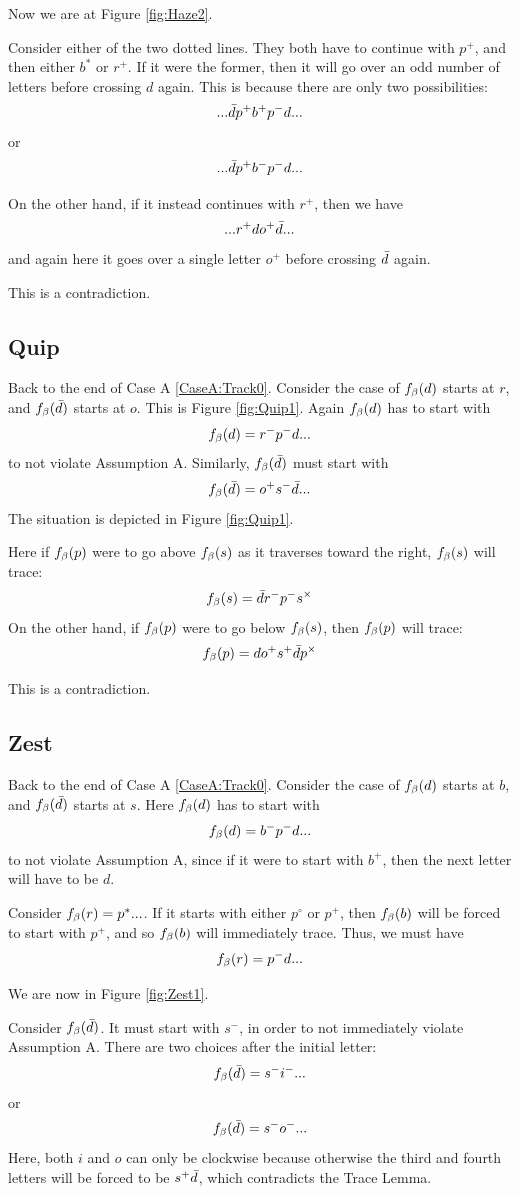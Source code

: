 Now we are at Figure \ref{fig:Haze2}.

Consider either of the two dotted lines. They both have to continue with $p^+$, and then either $b^*$ or $r^+$. If it were the former, then it will go over an odd number of letters before crossing $d$ again. This is because there are only two possibilities:
\[
...\bar{d} p^+ b^+ p^- d...
\]
or 
\[
...\bar{d} p^+ b^- p^- d...
\]

On the other hand, if it instead continues with $r^+$, then we have
\[
...r^+ d o^+ \bar{d}...
\]
and again here it goes over a single letter $o^+$ before crossing $\bar{d}$ again. 

This is a contradiction.

\subsection{Quip}\label{Quip}
Back to the end of Case A \ref{CaseA:Track0}. Consider the case of $f_\beta(d)$ starts at $r$, and $f_\beta(\bar{d})$ starts at $o$. This is Figure \ref{fig:Quip1}. Again $f_\beta(d)$ has to start with
\[
f_\beta(d) = r^- p^- d...
\]
to not violate Assumption A. Similarly, $f_\beta(\bar{d})$ must start with
\[
f_\beta(\bar{d}) = o^+ s^- \bar{d}...
\]
The situation is depicted in Figure \ref{fig:Quip1}.

Here if $f_\beta(p)$ were to go above $f_\beta(s)$ as it traverses toward the right, $f_\beta(s)$ will trace:
\[
f_\beta(s) = \bar{d} r^- p^- s^\times
\]
On the other hand, if $f_\beta(p)$ were to go below $f_\beta(s)$, then $f_\beta(p)$ will trace:
\[
f_\beta(p) = d o^+ s^+ \bar{d} p^\times
\]

This is a contradiction. 

\subsection{Zest} \label{Zest}

Back to the end of Case A \ref{CaseA:Track0}. Consider the case of $f_\beta(d)$ starts at $b$, and $f_\beta(\bar{d})$ starts at $s$. Here $f_\beta(d)$ has to start with
\[
f_\beta(d) = b^- p^- d...
\]
to not violate Assumption A, since if it were to start with $b^+$, then the next letter will have to be $d$.

Consider $f_\beta(r) = p^*...$. If it starts with either $p^\circ$ or $p^+$, then $f_\beta(b)$ will be forced to start with $p^+$, and so $f_\beta(b)$ will immediately trace. Thus, we must have
\[
f_\beta(r) = p^- d...
\]

We are now in Figure \ref{fig:Zest1}.

Consider $f_\beta(\bar{d})$. It must start with $s^-$, in order to not immediately violate Assumption A. There are two choices after the initial letter:
\[
f_\beta(\bar{d}) = s^- i^-...
\]
or
\[
f_\beta(\bar{d}) = s^- o^-...
\]
Here, both $i$ and $o$ can only be clockwise because otherwise the third and fourth letters will be forced to be $s^+\bar{d}$, which contradicts the Trace Lemma.

